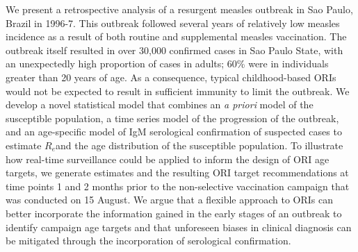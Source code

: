 We present a retrospective analysis of a resurgent measles outbreak in
Sao Paulo, Brazil in 1996-7. This outbreak followed several years of
relatively low measles incidence as a result of both routine and
supplemental measles vaccination. The outbreak itself resulted in over
30,000 confirmed cases in Sao Paulo State, with an unexpectedly high
proportion of cases in adults; 60\% were in individuals greater than 20
years of age. As a consequence, typical childhood-based ORIs would not
be expected to result in sufficient immunity to limit the outbreak. We
develop a novel statistical model that combines an \emph{a priori} model
of the susceptible population, a time series model of the progression of
the outbreak, and an age-specific model of IgM serological confirmation
of suspected cases to estimate \(R_{e}\)and the age distribution of the
susceptible population. To illustrate how real-time surveillance could
be applied to inform the design of ORI age targets, we generate
estimates and the resulting ORI target recommendations at time points 1
and 2 months prior to the non-selective vaccination campaign that was
conducted on 15 August. We argue that a flexible approach to ORIs can
better incorporate the information gained in the early stages of an
outbreak to identify campaign age targets and that unforeseen biases in
clinical diagnosis can be mitigated through the incorporation of
serological confirmation.